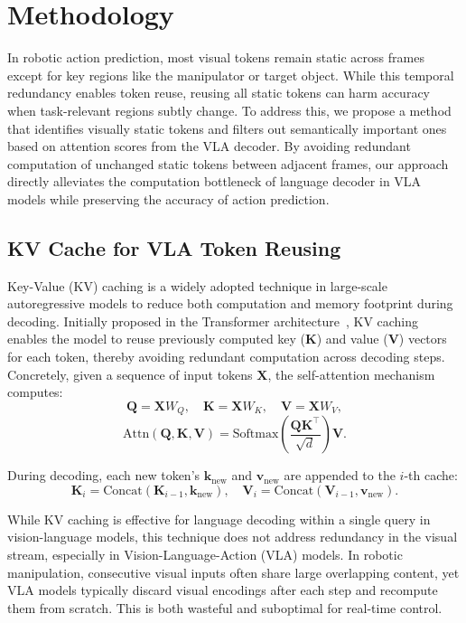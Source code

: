 \section{Methodology}
In robotic action prediction, most visual tokens remain static across frames except for key regions like the manipulator or target object. While this temporal redundancy enables token reuse, reusing all static tokens can harm accuracy when task-relevant regions subtly change. To address this, we propose a method that identifies visually static tokens and filters out semantically important ones based on attention scores from the VLA decoder. By avoiding redundant computation of unchanged static tokens between adjacent frames, our approach directly alleviates the computation bottleneck of language decoder in VLA models while preserving the accuracy of action prediction.

\subsection{KV Cache for VLA Token Reusing}
\label{sec:preliminary}
Key-Value (KV) caching is a widely adopted technique in large-scale autoregressive models to reduce both computation and memory footprint during decoding. Initially proposed in the Transformer architecture~\cite{vaswani2017attention}, KV caching enables the model to reuse previously computed key ($\mathbf{K}$) and value ($\mathbf{V}$) vectors for each token, thereby avoiding redundant computation across decoding steps. Concretely, given a sequence of input tokens $\mathbf{X}$, the self-attention mechanism computes:
\begin{equation}
\mathbf{Q} = \mathbf{X} W_Q, \quad \mathbf{K} = \mathbf{X} W_K, \quad \mathbf{V} = \mathbf{X} W_V,
\end{equation}
\begin{equation}
\mathrm{Attn}(\mathbf{Q}, \mathbf{K}, \mathbf{V}) =
\mathrm{Softmax}\left(\frac{\mathbf{Q} \mathbf{K}^\top}{\sqrt{d}}\right) \mathbf{V}.
\end{equation}

During decoding, each new token’s $\mathbf{k}_{\text{new}}$ and $\mathbf{v}_{\text{new}}$ are appended to the $i$-th cache:
\begin{equation}
\mathbf{K}_i = \mathrm{Concat}(\mathbf{K}_{i-1}, \mathbf{k}_{\text{new}}), \quad
\mathbf{V}_i = \mathrm{Concat}(\mathbf{V}_{i-1}, \mathbf{v}_{\text{new}}).
\end{equation}

While KV caching is effective for language decoding within a single query in vision-language models, this technique does not address redundancy in the visual stream, especially in Vision-Language-Action (VLA) models. In robotic manipulation, consecutive visual inputs often share large overlapping content, yet VLA models typically discard visual encodings after each step and recompute them from scratch. This is both wasteful and suboptimal for real-time control.

